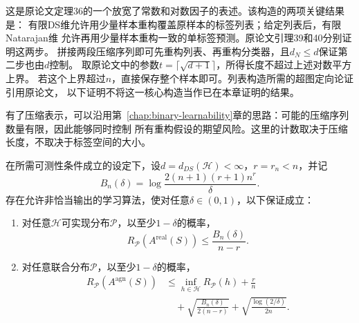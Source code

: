 这是原论文定理36的一个放宽了常数和对数因子的表述。该构造的两项关键结果是：
有限DS维允许用少量样本重构覆盖原样本的标签列表；给定列表后，有限Natarajan维
允许再用少量样本重构一致的单标签预测。原论文引理39和40分别证明这两步。
拼接两段压缩序列即可先重构列表、再重构分类器，且$d_N\leq d$保证第二步也由$d$控制。
取原论文中的参数$t=\lceil\sqrt{d+1}\rceil$，所得长度不超过上述对数平方上界。
若这个上界超过$n$，直接保存整个样本即可。列表构造所需的超图定向论证引用原论文，
以下证明不将这一核心构造当作已在本章证明的结果。

有了压缩表示，可以沿用第~\ref{chap:binary-learnability}章的思路：可能的压缩序列数量有限，因此能够同时控制
所有重构假设的期望风险。这里的计数取决于压缩长度，不取决于标签空间的大小。

\begin{theorem}[有限DS维的期望风险保证]
\label{thm:finite-ds-learning-rates}
在所需可测性条件成立的设定下，设$d=d_{DS}(\mathcal H)<\infty$，$r=r_n<n$，并记
\[
 B_n(\delta)=\log\frac{2(n+1)(r+1)n^r}{\delta}.
\]
存在允许非恰当输出的学习算法，使对任意$\delta\in(0,1)$，以下保证成立：
\begin{enumerate}
 \item 对任意$\mathcal H$可实现分布$\mathcal P$，以至少$1-\delta$的概率，
 \[
 R_{\mathcal P}(A^{\mathrm{real}}(S))
 \leq\frac{B_n(\delta)}{n-r}.
 \]
 \item 对任意联合分布$\mathcal P$，以至少$1-\delta$的概率，
 \begin{align*}
 R_{\mathcal P}(A^{\mathrm{agn}}(S))
 &\leq\inf_{h\in\mathcal H}R_{\mathcal P}(h)+\frac rn\\
 &\quad+\sqrt{\frac{B_n(\delta)}{2(n-r)}}
       +\sqrt{\frac{\log(2/\delta)}{2n}}.
 \end{align*}
\end{enumerate}
\end{theorem}

